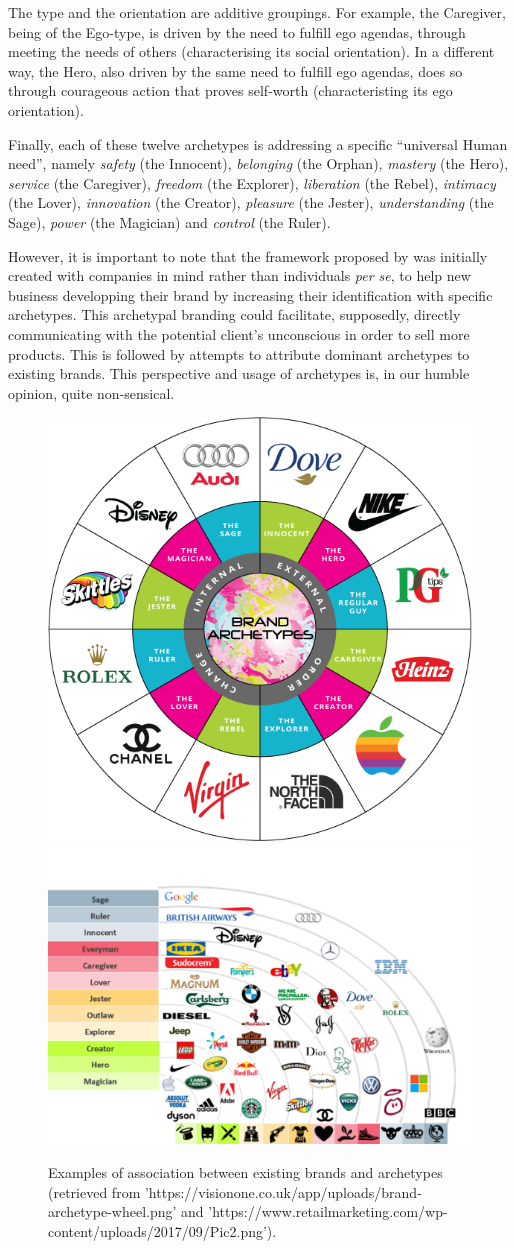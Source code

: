 \documentclass[]{book}
\begin{document}
The type and the orientation are additive groupings. For example, the Caregiver, being of the Ego-type, is driven by the need to fulfill ego agendas, through meeting the needs of others (characterising its social orientation). In a different way, the Hero, also driven by the same need to fulfill ego agendas, does so through courageous action that proves self-worth (characteristing its ego orientation).

Finally, each of these twelve archetypes is addressing a specific ``universal Human need'', namely \emph{safety} (the Innocent), \emph{belonging} (the Orphan), \emph{mastery} (the Hero), \emph{service} (the Caregiver), \emph{freedom} (the Explorer), \emph{liberation} (the Rebel), \emph{intimacy} (the Lover), \emph{innovation} (the Creator), \emph{pleasure} (the Jester), \emph{understanding} (the Sage), \emph{power} (the Magician) and \emph{control} (the Ruler).

However, it is important to note that the framework proposed by \citet{mark2001hero} was initially created with companies in mind rather than individuals \emph{per se}, to help new business developping their brand by increasing their identification with specific archetypes. This archetypal branding could facilitate, supposedly, directly communicating with the potential client's unconscious in order to sell more products. This is followed by attempts to attribute dominant archetypes to existing brands. This perspective and usage of archetypes is, in our humble opinion, quite non-sensical.

\begin{figure}

{\centering \includegraphics[width=0.49\linewidth]{img/brand_archetypes1} \includegraphics[width=0.49\linewidth]{img/brand_archetypes2} 

}

\caption{Examples of association between existing brands and archetypes (retrieved from 'https://visionone.co.uk/app/uploads/brand-archetype-wheel.png' and 'https://www.retailmarketing.com/wp-content/uploads/2017/09/Pic2.png').}\label{fig:unnamed-chunk-5}
\end{figure}
\end{document}
